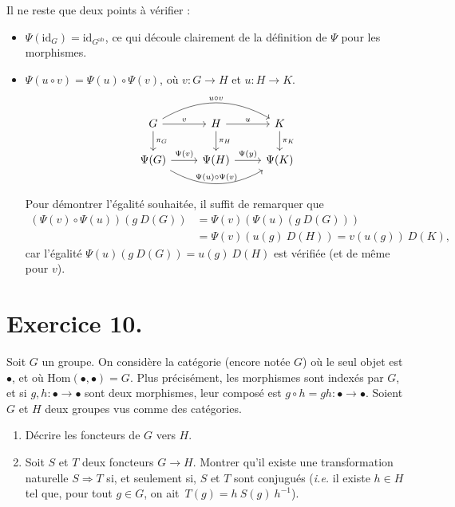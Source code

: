\documentclass{../../td}
\begin{document}
\begin{enumerate}
      Il ne reste que deux points à vérifier :
      \begin{itemize}
        \item $\Psi(\mathrm{id}_G) = \mathrm{id}_{G^\mathrm{ab}}$, ce qui découle clairement de la définition de $\Psi$ pour les morphismes.
        \item $\Psi(u \circ v) = \Psi(u) \circ \Psi(v)$, où $v : G \to H$ et $u: H \to K$.
          \[
          \begin{tikzcd}
            G \arrow{r}{v}\arrow[bend left]{rr}{u \circ v} \arrow{d}{\pi_G} & H \arrow{r}{u} \arrow{d}{\pi_H} & K \arrow{d}{\pi_K}\\
            \Psi(G) \arrow{r}{\Psi(v)}\arrow[bend right]{rr}{\Psi(u)\circ \Psi(v)} & \Psi(H) \arrow{r}{\Psi(y)} & \Psi(K)
          \end{tikzcd}
        \]
        Pour démontrer l'égalité souhaitée, il suffit de remarquer que
        \begin{align*}
          (\Psi(v)\circ \Psi(u))(g\: D(G)) &= \Psi(v)(\Psi(u)(g\:D(G)))\\
          &= \Psi(v)(u(g)\:D(H)) = v(u(g))\:D(K)
        ,\end{align*}
        car l'égalité $\Psi(u)(g\: D(G)) = u(g)\:D(H)$ est vérifiée (et de même pour $v$).
      \end{itemize}
  \end{enumerate}

  \chapter{Exercice 10.}

  \begin{slshape}
    \color{deepblue}
    Soit $G$ un groupe.
    On considère la catégorie (encore notée $G$) où le seul objet est $\bullet$, et où $\mathrm{Hom}(\bullet,\bullet) = G$.
    Plus précisément, les morphismes sont indexés par $G$, et si $g,h : \bullet \to \bullet$ sont deux morphismes, leur composé est $g\circ h = gh : \bullet \to \bullet$.
    Soient $G$ et $H$ deux groupes vus comme des catégories.
    \begin{enumerate}
      \item Décrire les foncteurs de $G$ vers $H$.
      \item Soit $S$ et $T$ deux foncteurs $G \to H$. Montrer qu'il existe une transformation naturelle $S \Rightarrow T$ si, et seulement si, $S$ et $T$ sont conjugués (\textit{i.e.} il existe $h \in H$ tel que, pour tout $g \in G$, on ait~$T(g) = h\:S(g)\:h^{-1}$).
    \end{enumerate}
  \end{slshape}
\end{document}
